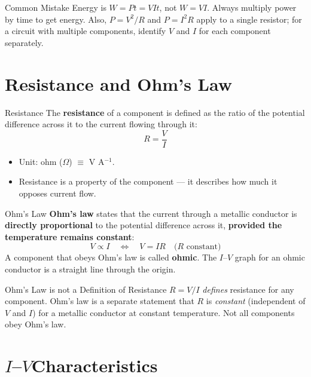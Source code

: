 \begin{warningbox}{Common Mistake}
Energy is $W = Pt = VIt$, not $W = VI$. Always multiply power by time to get energy. Also, $P = V^2/R$ and $P = I^2R$ apply to a single resistor; for a circuit with multiple components, identify $V$ and $I$ for each component separately.
\end{warningbox}

\section{Resistance and Ohm's Law}

\begin{definitionbox}{Resistance}
The \textbf{resistance} of a component is defined as the ratio of the potential difference across it to the current flowing through it:
$$R = \frac{V}{I}$$
\begin{itemize}[itemsep=2pt]
  \item Unit: ohm ($\Omega$) $\equiv$ V A$^{-1}$.
  \item Resistance is a property of the component — it describes how much it opposes current flow.
\end{itemize}
\end{definitionbox}

\begin{definitionbox}{Ohm's Law}
\textbf{Ohm's law} states that the current through a metallic conductor is \textbf{directly proportional} to the potential difference across it, \textbf{provided the temperature remains constant}:
$$V \propto I \quad \Leftrightarrow \quad V = IR \quad \text{($R$ constant)}$$
A component that obeys Ohm's law is called \textbf{ohmic}. The $I$--$V$ graph for an ohmic conductor is a straight line through the origin.
\end{definitionbox}

\begin{warningbox}{Ohm's Law is not a Definition of Resistance}
$R = V/I$ \emph{defines} resistance for any component. Ohm's law is a separate statement that $R$ is \emph{constant} (independent of $V$ and $I$) for a metallic conductor at constant temperature. Not all components obey Ohm's law.
\end{warningbox}

\section{{$I$--$V$}Characteristics}

